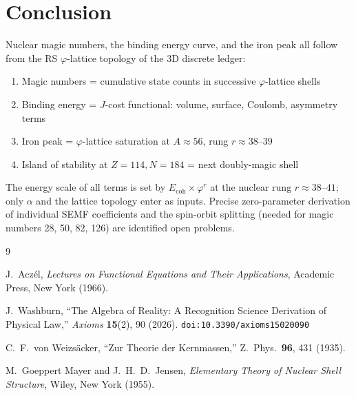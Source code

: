 \documentclass[12pt,a4paper]{article}
\theoremstyle{definition}
\theoremstyle{remark}
\begin{document}
\section{Conclusion}

Nuclear magic numbers, the binding energy curve, and the iron peak all follow from 
the RS $\varphi$-lattice topology of the 3D discrete ledger:
\begin{enumerate}
\item Magic numbers = cumulative state counts in successive $\varphi$-lattice shells
\item Binding energy = $J$-cost functional: volume, surface, Coulomb, asymmetry terms
\item Iron peak = $\varphi$-lattice saturation at $A \approx 56$, rung $r \approx 38$--$39$
\item Island of stability at $Z = 114, N = 184$ = next doubly-magic shell
\end{enumerate}

The energy scale of all terms is set by $E_{\mathrm{coh}} \times \varphi^{r}$ at the
nuclear rung $r \approx 38$--$41$; only $\alpha$ and the lattice topology enter as inputs.
Precise zero-parameter derivation of individual SEMF coefficients and the spin-orbit
splitting (needed for magic numbers 28, 50, 82, 126) are identified open problems.

\begin{thebibliography}{9}

J.~Acz\'el, \emph{Lectures on Functional Equations and Their Applications},
Academic Press, New York (1966).

J.~Washburn, ``The Algebra of Reality: A Recognition Science Derivation
of Physical Law,'' \emph{Axioms} \textbf{15}(2), 90 (2026).
\texttt{doi:10.3390/axioms15020090}

C.~F.~von Weizs\"{a}cker, ``Zur Theorie der Kernmassen,''
Z.\ Phys.\ \textbf{96}, 431 (1935).

M.~Goeppert Mayer and J.~H.~D.~Jensen, \emph{Elementary Theory of
Nuclear Shell Structure}, Wiley, New York (1955).
\end{thebibliography}
\end{document}
